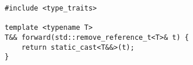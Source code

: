 \begin{lstlisting}[title=\href{https://godbolt.org/z/EjPnPr}{\texttt{godbolt.org/z/EjPnPr}}]
#include <type_traits>

template <typename T>
T&& forward(std::remove_reference_t<T>& t) {
    return static_cast<T&&>(t);
}
\end{lstlisting}
